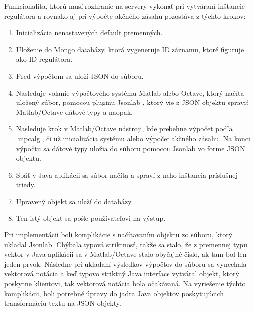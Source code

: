 Funkcionalita, ktorú musí rozhranie na servery vykonať pri vytváraní inštancie regulátora a rovnako aj pri výpočte akčného zásahu pozostáva z týchto krokov:
\begin{enumerate}
  \item Inicializácia nenastavených default premenných.
  \item Uloženie do Mongo databázy, ktorá vygeneruje ID záznamu, ktoré figuruje ako ID regulátora.
  \item  Pred výpočtom sa uloží JSON do súboru.  
  \item Nasleduje volanie výpočtového systému Matlab alebo
   Octave, ktorý načíta uložený súbor, pomocou pluginu Jsonlab \cite{IOT29}, ktorý vie z JSON objektu spraviť Matlab/Octave dátové typy a naopak.
  \item Nasleduje krok v Matlab/Octave nástroji, kde prebehne výpočet podľa \ref{mpcalg}, či už inicializácia systému alebo výpočet akčného zásahu. Na konci výpočtu sa dátové typy uložia do súboru pomocou Jsonlab vo forme JSON objektu.
  \item Späť v Java aplikácii sa súbor načíta a spraví z neho inštancia príslušnej triedy. 
  \item Upravený objekt sa uloží do databázy.
  \item Ten istý objekt sa pošle používateľovi na výstup.
\end{enumerate} 
Pri implementácii boli komplikácie s načítavaním objektu zo súboru, ktorý ukladal Jsonlab. Chýbala typová striktnosť, takže sa stalo, že z premennej typu vektor v Java aplikácii sa v Matlab/Octave stalo obyčajné číslo, ak tam bol len jeden prvok. Následne pri ukladaní výsledkov výpočtov do súboru sa vynechala vektorová notácia a keď typovo striktný Java interface vytváral objekt, ktorý poskytne klientovi, tak vektorová notácia bola očakávaná. Na vyriešenie týchto komplikácii, boli potrebné úpravy do jadra Java objektov poskytujúcich transformáciu textu na JSON objekty. 

